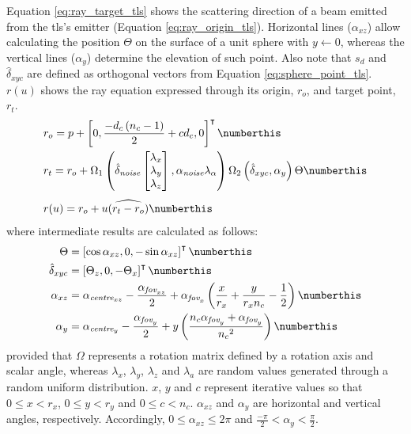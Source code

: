 Equation \ref{eq:ray_target_tls} shows the scattering direction of a beam emitted from the \acrshort{tls}'s emitter (Equation \ref{eq:ray_origin_tls}). Horizontal lines ($\alpha_{xz}$) allow calculating the position $\Theta$ on the surface of a unit sphere with $y \gets 0$, whereas the vertical lines ($\alpha_{y}$) determine the elevation of such point. Also note that $s_{d}$ and $\hat{\delta}_{xyc}$ are defined as orthogonal vectors from Equation \ref{eq:sphere_point_tls}. $r(u)$ shows the ray equation expressed through its origin, $r_{o}$, and target point, $r_{t}$. 
\begin{align*}
    &r_{o} = p + \left[0, \frac{-d_{c}\left(n_{c} - 1\right)}{2} + c d_{c}, 0\right]^\intercal 
    \numberthis \label{eq:ray_origin_tls}\\
    &r_{t} = r_{o} + \Omega_{1}\left(\hat{\delta}_{\textit{noise}}\begin{bmatrix}\lambda_{x} \\ \lambda_{y} \\ \lambda_{z} \end{bmatrix}, \alpha_{\textit{noise}}\lambda_{\alpha}\right) \Omega_{2}\left(\hat{\delta}_{xyc}, \alpha_{y}\right) \Theta
    \numberthis \label{eq:ray_target_tls}\\[.4em]
    &r(u) = r_o + u\widehat{\left(r_{t} - r_{o}\right)}
    \numberthis \label{eq:ray_equation_tls}
\end{align*}
where intermediate results are calculated as follows:
\begin{align*}
    \Theta &= \left[\cos{\alpha_{xz}}, 0, -\sin{\alpha_{xz}}\right]^\intercal 
    \numberthis \label{eq:sphere_point_tls}\\
    \hat{\delta}_{xyc} &= \left[\Theta_{z}, 0, -\Theta_{x}\right]^\intercal
    \numberthis \label{eq:sphere_angle_tls}\\
    \alpha_{xz} &= \alpha_{\textit{centre}_{xz}} - \frac{\alpha_{\textit{fov}_{xz}}}{2} + \alpha_{\textit{fov}_{x}}\left(\frac{x}{r_{x}} + \frac{y}{ r_{x}n_{c}} - \frac{1}{2}\right)
    \numberthis \label{eq:horizontal_angle_tls}\\
    \alpha_{y} &= \alpha_{\textit{centre}_{y}} - \frac{\alpha_{\textit{fov}_{y}}}{2} + y\left(\frac{n_{c}\alpha_{\textit{fov}_{y}} + \alpha_{\textit{fov}_{y}}}{{n_{c}}^2}\right)
    \numberthis \label{eq:vertical_angle_tls}
\end{align*}
provided that $\Omega$ represents a rotation matrix defined by a rotation axis and scalar angle, whereas $\lambda_{x}$, $\lambda_{y}$, $\lambda_{z}$ and $\lambda_{a}$ are random values generated through a random uniform distribution. $x$, $y$ and $c$ represent iterative values so that $0 \leq x < r_{x}$, $0 \leq y < r_{y}$ and $0 \leq c < n_{c}$. $\alpha_{xz}$ and $\alpha_{y}$ are horizontal and vertical angles, respectively. Accordingly, $0 \leq \alpha_{xz} \leq 2\pi$ and $\frac{-\pi}{2} < \alpha_{y} < \frac{\pi}{2}$. 

